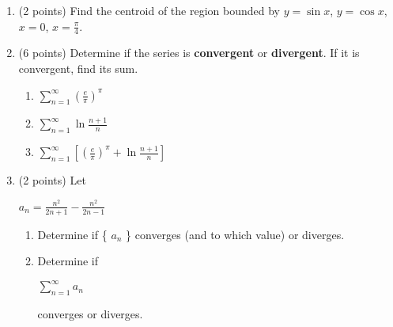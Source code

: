 \documentclass[paper=a4, fontsize=11pt]{scrartcl} %
\numberwithin{equation}{section} %
\numberwithin{figure}{section} %
\numberwithin{table}{section} %
\begin{document}
\begin{enumerate}
\item (2 points) Find the centroid of the region bounded by $y= \sin x$, $y= \cos x$, $x = 0$, $x = \frac{\pi}{4}$. \\

\newpage


\item (6 points) Determine if the series is \textbf{convergent} or \textbf{divergent}.  If it is convergent, find its sum.
\begin{enumerate}
\item \begin{large}$\sum\limits_{n=1}^\infty \left( \frac{e}{\pi} \right)^\pi$\end{large}
\vspace{2.5in}
\item \begin{large}$\sum\limits_{n=1}^\infty \ln \frac{n+1}{n}$\end{large}
\vspace{2.5in}
\item \begin{large}$\sum\limits_{n=1}^\infty \left[ \left( \frac{e}{\pi} \right)^\pi + \ln \frac{n+1}{n} \right]$\end{large}
\end{enumerate}

\newpage
\item (2 points) Let \begin{large}$a_n=\frac{n^2}{2n+1}-\frac{n^2}{2n-1}$\end{large}
\begin{enumerate}
\item Determine if \{ $a_n$ \} converges (and to which value) or diverges.
\vspace{3.5in}
\item Determine if \begin{large}$\sum\limits_{n=1}^\infty a_n$\end{large} converges or diverges.
\end{enumerate}


\end{enumerate}
\end{document}
